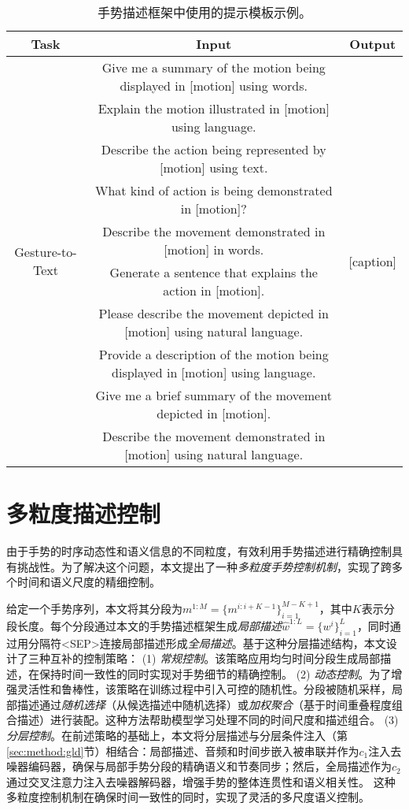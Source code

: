 \begin{table*}[t]
\centering
\caption{手势描述框架中使用的提示模板示例。}
\footnotesize
\label{tab:prompt_templates}
\begin{tabular}{ccc}
\toprule
Task & Input & Output \\
\midrule
\multirow{10}{*}{Gesture-to-Text} & Give me a summary of the motion being displayed in [motion] using words. & \multirow{10}{*}{[caption]} \\
& Explain the motion illustrated in [motion] using language. & \\
& Describe the action being represented by [motion] using text. & \\
& What kind of action is being demonstrated in [motion]? & \\
& Describe the movement demonstrated in [motion] in words. & \\
& Generate a sentence that explains the action in [motion]. & \\
& Please describe the movement depicted in [motion] using natural language. & \\
& Provide a description of the motion being displayed in [motion] using language. & \\
& Give me a brief summary of the movement depicted in [motion]. & \\
& Describe the movement demonstrated in [motion] using natural language. & \\
\bottomrule
\end{tabular}
\end{table*}

\section{多粒度描述控制}
\label{sec:method:control}
由于手势的时序动态性和语义信息的不同粒度，有效利用手势描述进行精确控制具有挑战性。为了解决这个问题，本文提出了一种\textit{多粒度手势控制机制}，实现了跨多个时间和语义尺度的精细控制。

给定一个手势序列，本文将其分段为$m^{1:M}=\{m^{i:i+K-1}\}_{i=1}^{M-K+1}$，其中$K$表示分段长度。每个分段通过本文的手势描述框架生成\textit{局部描述}$\hat{w}^{1:L}=\{w^i\}^L_{i=1}$，同时通过用分隔符<SEP>连接局部描述形成\textit{全局描述}。基于这种分层描述结构，本文设计了三种互补的控制策略：
(1) \textit{常规控制}。该策略应用均匀时间分段生成局部描述，在保持时间一致性的同时实现对手势细节的精确控制。
(2) \textit{动态控制}。为了增强灵活性和鲁棒性，该策略在训练过程中引入可控的随机性。分段被随机采样，局部描述通过\textit{随机选择}（从候选描述中随机选择）或\textit{加权聚合}（基于时间重叠程度组合描述）进行装配。这种方法帮助模型学习处理不同的时间尺度和描述组合。
(3) \textit{分层控制}。在前述策略的基础上，本文将分层描述与分层条件注入（第\ref{sec:method:gld}节）相结合：局部描述、音频和时间步嵌入被串联并作为$c_1$注入去噪器编码器，确保与局部手势分段的精确语义和节奏同步；然后，全局描述作为$c_2$通过交叉注意力注入去噪器解码器，增强手势的整体连贯性和语义相关性。
这种多粒度控制机制在确保时间一致性的同时，实现了灵活的多尺度语义控制。



